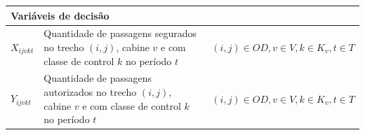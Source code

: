 \begin{table}[H]
\begin{tabular}{p{2cm} p{9.5cm} p{3.2cm}}
		\multicolumn{3}{l}{\textbf{Variáveis de decisão}}                                                                                                                                                                                                                                                                                                                                                                                                                                                 \\ \midrule
		$X_{ijvkt}$        & Quantidade de passagens segurados no trecho $(i,j)$, cabine $v$ e com classe de control $k$ no período $t$                                                                                                                                                                                                                                                                                                                    & $(i,j) \in OD, v \in V, k \in K_v, t \in T$  \\
		$Y_{ijvkt}$        & Quantidade de passagens autorizados no trecho $(i,j)$, cabine $v$ e com classe de control $k$ no período $t$                                                                                                                                                                                                                                                                                                                   & $(i,j) \in OD, v \in V, k \in K_v, t \in T$  \\

\end{tabular}
\end{table}
